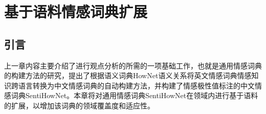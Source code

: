 \chapter{基于语料情感词典扩展}
\label{ch3}

\section{引言}
上一章内容主要介绍了进行观点分析的所需的一项基础工作，也就是通用情感词典的构建方法的研究，提出了根据语义词典HowNet语义关系将英文情感词典情感知识跨语言转换为中文情感词典的自动构建方法，并构建了情感极性值标注的中文情感词典SentiHowNet。本章将对通用情感词典SentiHowNet在领域内进行基于语料的扩展，以增加该词典的领域覆盖度和适应性。


